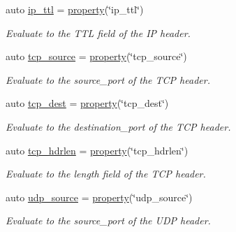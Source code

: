 \begin{DoxyCompactItemize}
auto \hyperlink{namespacepfq_1_1lang_1_1anonymous__namespace_02default_8hpp_03_a885339d6e5b34ec5d037e085dfba9851}{ip\+\_\+ttl} = \hyperlink{namespacepfq_1_1lang_a1249450e72229273b0db707a286aea91}{property}(\char`\"{}ip\+\_\+ttl\char`\"{})
\begin{DoxyCompactList}\small\item\em Evaluate to the {\ttfamily T\+TL} field of the IP header. \end{DoxyCompactList}\item 
auto \hyperlink{namespacepfq_1_1lang_1_1anonymous__namespace_02default_8hpp_03_a367a9ec6d91677553073c54a059b391d}{tcp\+\_\+source} = \hyperlink{namespacepfq_1_1lang_a1249450e72229273b0db707a286aea91}{property}(\char`\"{}tcp\+\_\+source\char`\"{})
\begin{DoxyCompactList}\small\item\em Evaluate to the {\ttfamily source\+\_\+port} of the T\+CP header. \end{DoxyCompactList}\item 
auto \hyperlink{namespacepfq_1_1lang_1_1anonymous__namespace_02default_8hpp_03_a83741c074712431d2e75f09744bb7486}{tcp\+\_\+dest} = \hyperlink{namespacepfq_1_1lang_a1249450e72229273b0db707a286aea91}{property}(\char`\"{}tcp\+\_\+dest\char`\"{})
\begin{DoxyCompactList}\small\item\em Evaluate to the {\ttfamily destination\+\_\+port} of the T\+CP header. \end{DoxyCompactList}\item 
auto \hyperlink{namespacepfq_1_1lang_1_1anonymous__namespace_02default_8hpp_03_a678163384b58e4682bdbaf7efdd22cfb}{tcp\+\_\+hdrlen} = \hyperlink{namespacepfq_1_1lang_a1249450e72229273b0db707a286aea91}{property}(\char`\"{}tcp\+\_\+hdrlen\char`\"{})
\begin{DoxyCompactList}\small\item\em Evaluate to the {\ttfamily length} field of the T\+CP header. \end{DoxyCompactList}\item 
auto \hyperlink{namespacepfq_1_1lang_1_1anonymous__namespace_02default_8hpp_03_ab44590359ef60febe9bfc6465bcf932a}{udp\+\_\+source} = \hyperlink{namespacepfq_1_1lang_a1249450e72229273b0db707a286aea91}{property}(\char`\"{}udp\+\_\+source\char`\"{})
\begin{DoxyCompactList}\small\item\em Evaluate to the {\ttfamily source\+\_\+port} of the U\+DP header. \end{DoxyCompactList}\item 

\end{DoxyCompactItemize}

